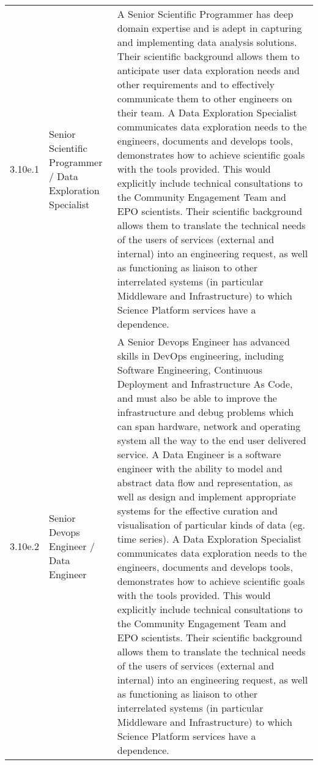 \begin{longtable} {|p{}|p{}|p{}|}
{} \\ \hline
{3.10e.1}&{Senior Scientific Programmer / Data Exploration Specialist}&{A Senior Scientific Programmer has deep domain expertise and is adept in capturing and implementing data analysis solutions. Their scientific background allows them to anticipate user data exploration needs and other requirements and to effectively communicate them to other engineers on their team.
A Data Exploration Specialist communicates data exploration needs to the engineers, documents and develops tools, demonstrates how to achieve scientific goals with the tools provided. This would explicitly include technical consultations to the Community Engagement Team and EPO scientists. Their scientific background allows them to translate the technical needs of the users of services (external and internal) into an engineering request, as well as functioning as liaison to other interrelated systems (in particular Middleware and Infrastructure) to which Science Platform services have a dependence.
} \\ \hline
{3.10e.2}&{Senior Devops Engineer / Data Engineer}&{A Senior Devops Engineer has advanced skills in DevOps engineering, including Software Engineering, Continuous Deployment and Infrastructure As Code, and must also be able to improve the infrastructure and debug problems which can span hardware, network and operating system all the way to the end user delivered service.
A Data Engineer is a software engineer with the ability to model and abstract data flow and representation, as well as design and implement appropriate systems for the effective curation and visualisation of particular kinds of data (eg. time series). 
A Data Exploration Specialist communicates data exploration needs to the engineers, documents and develops tools, demonstrates how to achieve scientific goals with the tools provided. This would explicitly include technical consultations to the Community Engagement Team and EPO scientists. Their scientific background allows them to translate the technical needs of the users of services (external and internal) into an engineering request, as well as functioning as liaison to other interrelated systems (in particular Middleware and Infrastructure) to which Science Platform services have a dependence.} \\ \hline
\end{longtable} \normalsize
